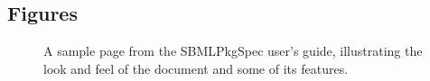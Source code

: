 \documentclass{bmcart}
\newcommand{\sbmlpkg}{SBMLPkgSpec}
\begin{document}
\begin{backmatter}



\section*{Figures}


\begin{figure}[h!]
\caption{A sample page from the \sbmlpkg{} user's guide, illustrating the look and feel of the document and some of its features.}
\end{figure}



\end{backmatter}
\end{document}
